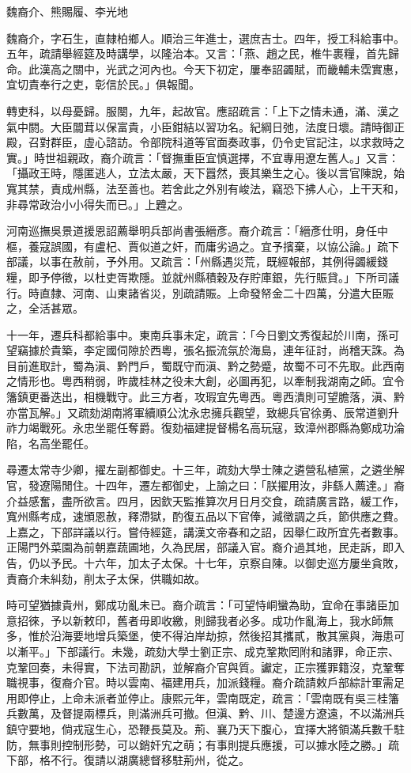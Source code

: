 
\begin{pinyinscope}
魏裔介、熊賜履、李光地

魏裔介，字石生，直隸柏鄉人。順治三年進士，選庶吉士。四年，授工科給事中。五年，疏請舉經筵及時講學，以隆治本。又言：「燕、趙之民，椎牛裹糧，首先歸命。此漢高之關中，光武之河內也。今天下初定，屢奉詔蠲賦，而畿輔未霑實惠，宜切責奉行之吏，彰信於民。」俱報聞。

轉吏科，以母憂歸。服闋，九年，起故官。應詔疏言：「上下之情未通，滿、漢之氣中閼。大臣闒茸以保富貴，小臣鉗結以習功名。紀綱日弛，法度日壞。請時御正殿，召對群臣，虛心諮訪。令部院科道等官面奏政事，仍令史官記注，以求救時之實。」時世祖親政，裔介疏言：「督撫重臣宜慎選擇，不宜專用遼左舊人。」又言：「攝政王時，隱匿逃人，立法太嚴，天下囂然，喪其樂生之心。後以言官陳說，始寬其禁，責成州縣，法至善也。若舍此之外別有峻法，竊恐下拂人心，上干天和，非尋常政治小小得失而已。」上韙之。

河南巡撫吳景道援恩詔薦舉明兵部尚書張縉彥。裔介疏言：「縉彥仕明，身任中樞，養寇誤國，有盧杞、賈似道之奸，而庸劣過之。宜予擯棄，以協公論。」疏下部議，以事在赦前，予外用。又疏言：「州縣遇災荒，既經報部，其例得蠲緩錢糧，即予停徵，以杜吏胥欺隱。並就州縣積穀及存貯庫銀，先行賑貸。」下所司議行。時直隸、河南、山東諸省災，別疏請賑。上命發帑金二十四萬，分遣大臣賑之，全活甚眾。

十一年，遷兵科都給事中。東南兵事未定，疏言：「今日劉文秀復起於川南，孫可望竊據於貴築，李定國伺隙於西粵，張名振流氛於海島，連年征討，尚稽天誅。為目前進取計，蜀為滇、黔門戶，蜀既守而滇、黔之勢蹙，故蜀不可不先取。此西南之情形也。粵西稍弱，昨歲桂林之役未大創，必圖再犯，以牽制我湖南之師。宜令籓鎮更番迭出，相機戰守。此三方者，攻瑕宜先粵西。粵西潰則可望膽落，滇、黔亦當瓦解。」又疏劾湖南將軍續順公沈永忠擁兵觀望，致總兵官徐勇、辰常道劉升祚力竭戰死。永忠坐罷任奪爵。復劾福建提督楊名高玩寇，致漳州郡縣為鄭成功淪陷，名高坐罷任。

尋遷太常寺少卿，擢左副都御史。十三年，疏劾大學士陳之遴營私植黨，之遴坐解官，發遼陽閒住。十四年，遷左都御史，上諭之曰：「朕擢用汝，非繇人薦達。」裔介益感奮，盡所欲言。四月，因欽天監推算次月日月交食，疏請廣言路，緩工作，寬州縣考成，速頒恩赦，釋滯獄，酌復五品以下官俸，減徵調之兵，節供應之費。上嘉之，下部詳議以行。嘗侍經筵，講漢文帝春和之詔，因舉仁政所宜先者數事。正陽門外菜園為前朝嘉蔬圃地，久為民居，部議入官。裔介過其地，民走訴，即入告，仍以予民。十六年，加太子太保。十七年，京察自陳。以御史巡方屢坐貪敗，責裔介未糾劾，削太子太保，供職如故。

時可望猶據貴州，鄭成功亂未已。裔介疏言：「可望恃峒蠻為助，宜命在事諸臣加意招徠，予以新敕印，舊者毋即收繳，則歸我者必多。成功作亂海上，我水師無多，惟於沿海要地增兵築堡，使不得泊岸劫掠，然後招其攜貳，散其黨與，海患可以漸平。」下部議行。未幾，疏劾大學士劉正宗、成克鞏欺罔附和諸罪，命正宗、克鞏回奏，未得實，下法司勘訊，並解裔介官與質。讞定，正宗獲罪籍沒，克鞏奪職視事，復裔介官。時以雲南、福建用兵，加派錢糧。裔介疏請敕戶部綜計軍需足用即停止，上命未派者並停止。康熙元年，雲南既定，疏言：「雲南既有吳三桂籓兵數萬，及督提兩標兵，則滿洲兵可撤。但滇、黔、川、楚邊方遼遠，不以滿洲兵鎮守要地，倘戎寇生心，恐鞭長莫及。荊、襄乃天下腹心，宜擇大將領滿兵數千駐防，無事則控制形勢，可以銷奸宄之萌；有事則提兵應援，可以據水陸之勝。」疏下部，格不行。復請以湖廣總督移駐荊州，從之。


\end{pinyinscope}
